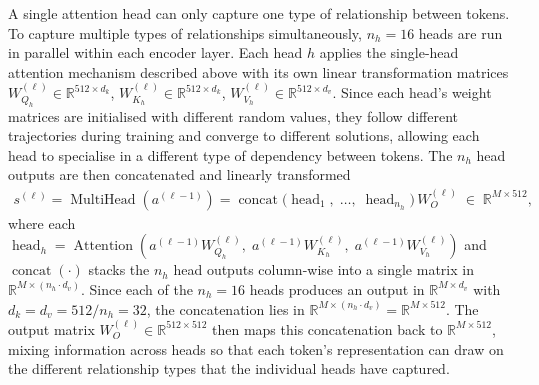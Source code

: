 A single attention head can only capture one type of relationship
between tokens. To capture multiple types of relationships
simultaneously, $n_h = 16$ heads are run in parallel within each
encoder layer. Each head $h$ applies the single-head attention mechanism
described above with its own linear transformation matrices
$W_{Q_h}^{(\ell)} \in \mathbb{R}^{512 \times d_k}$,
$W_{K_h}^{(\ell)} \in \mathbb{R}^{512 \times d_k}$,
$W_{V_h}^{(\ell)} \in \mathbb{R}^{512 \times d_v}$. Since each head's weight
matrices are initialised with different random values, they follow
different trajectories during training and converge to different
solutions, allowing each head to specialise in a different type of
dependency between tokens. The $n_h$ head outputs are then concatenated
and linearly transformed
\begin{align*}
   s^{(\ell)} = \operatorname{MultiHead}(a^{(\ell - 1)})
    = \operatorname{concat}\!\bigl(
        \operatorname{head}_1,\;\dots,\;\operatorname{head}_{n_h}
    \bigr)\, W_O^{(\ell)}
    \;\in\; \mathbb{R}^{M \times 512},
\end{align*}
where each $\operatorname{head}_h = \operatorname{Attention}(a^{(\ell - 1)} W_{Q_h}^{(\ell)},\; a^{(\ell - 1)} W_{K_h}^{(\ell)},\; a^{(\ell - 1)} W_{V_h}^{(\ell)})$ and $\operatorname{concat}(\cdot)$ stacks the $n_h$ head outputs column-wise into a single matrix in $\mathbb{R}^{M \times (n_h \cdot d_v)}$. Since each of the $n_h = 16$ heads produces an output in $\mathbb{R}^{M \times d_v}$ with $d_k = d_v = 512 / n_h = 32$, the concatenation lies in $\mathbb{R}^{M \times (n_h \cdot d_v)} = \mathbb{R}^{M \times 512}$. The output matrix $W_O^{(\ell)} \in \mathbb{R}^{512 \times 512}$ then maps this concatenation back to $\mathbb{R}^{M \times 512}$, mixing information across heads so that each token's representation can draw on the different relationship types that the individual heads have captured\citep{AttentionIsAllYouNeed}.

